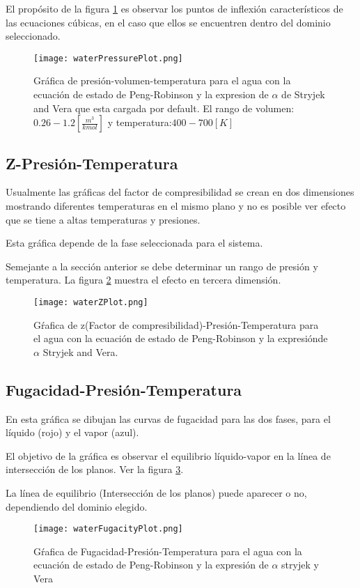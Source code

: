 		El propósito de la figura \ref{fig:press} es observar los puntos de inflexión característicos de las ecuaciones cúbicas, en el caso que ellos se encuentren dentro del dominio seleccionado.

		\begin{figure}[!h]
			\texttt{[image: waterPressurePlot.png]}
			\caption{Gráfica de presión-volumen-temperatura para el agua con la ecuación de estado de Peng-Robinson y la expresion de $\alpha$ de Stryjek and Vera que esta cargada por default. El rango de volumen: $0.26-1.2 [\frac{m^3}{kmol}]$ y temperatura:$400-700[K]$ }
			\label{fig:press}
		\end{figure}
	\subsection{Z-Presión-Temperatura}\label{subsec:zpt}
		Usualmente las gráficas del factor de compresibilidad se crean en dos dimensiones mostrando diferentes temperaturas en el mismo plano y no es posible ver efecto que se tiene a altas temperaturas y presiones.

		Esta gráfica depende de la fase seleccionada para el sistema.

		Semejante a la sección anterior se debe determinar un rango de presión y temperatura. La figura \ref{fig:zplot} muestra el efecto en tercera dimensión.
		\begin{figure}[!h]
			\texttt{[image: waterZPlot.png]}
			\caption{Gŕafica de z(Factor de compresibilidad)-Presión-Temperatura para el agua con la ecuación de estado de Peng-Robinson y la expresiónde $\alpha$ Stryjek and Vera.}
			\label{fig:zplot}
		\end{figure}
	\subsection{Fugacidad-Presión-Temperatura}\label{subsec:fpt}

		En esta gráfica se dibujan las curvas de fugacidad para las dos fases, para el líquido (rojo) y el vapor (azul).

		El objetivo de la gráfica es observar el equilibrio líquido-vapor en la línea de intersección de los planos. Ver la figura \ref{fig:fugplot}.

		La línea de equilibrio (Intersección de los planos) puede aparecer o no, dependiendo del dominio elegido.

		\begin{figure}[!h]
			\texttt{[image: waterFugacityPlot.png]}
			\caption{Gŕafica de Fugacidad-Presión-Temperatura para el agua con la ecuación de estado de Peng-Robinson y la expresión de $\alpha$ stryjek y Vera}
			\label{fig:fugplot}
		\end{figure}
